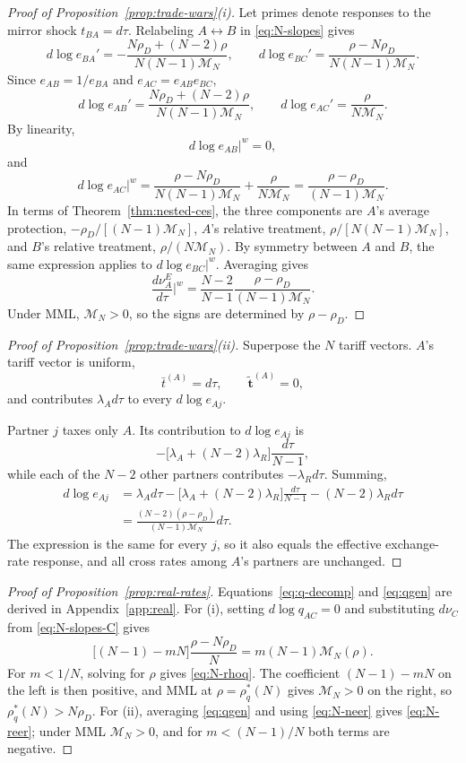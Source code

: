 \documentclass[11pt]{article}
\begin{document}
\begin{proof}[Proof of Proposition~\ref{prop:trade-wars}(i)]
Let primes denote responses to the mirror shock $t_{BA}=d\tau$. Relabeling $A\leftrightarrow B$ in \eqref{eq:N-slopes} gives
\[
d\log e_{BA}' = -\frac{N\rho_D+(N-2)\rho}{N(N-1)\mathcal M_N},
\qquad
d\log e_{BC}' = \frac{\rho-N\rho_D}{N(N-1)\mathcal M_N}.
\]
Since $e_{AB}=1/e_{BA}$ and $e_{AC}=e_{AB}e_{BC}$,
\[
d\log e_{AB}' = \frac{N\rho_D+(N-2)\rho}{N(N-1)\mathcal M_N},
\qquad
d\log e_{AC}' = \frac{\rho}{N\mathcal M_N}.
\]
By linearity,
\[
d\log e_{AB}\big|^w = 0,
\]
and
\[
d\log e_{AC}\big|^w = \frac{\rho-N\rho_D}{N(N-1)\mathcal M_N} + \frac{\rho}{N\mathcal M_N} = \frac{\rho-\rho_D}{(N-1)\mathcal M_N}.
\]
In terms of Theorem~\ref{thm:nested-ces}, the three components are $A$'s average protection, $-\rho_D/[(N-1)\mathcal M_N]$, $A$'s relative treatment, $\rho/[N(N-1)\mathcal M_N]$, and $B$'s relative treatment, $\rho/(N\mathcal M_N)$.
By symmetry between $A$ and $B$, the same expression applies to $d\log e_{BC}|^w$. Averaging gives
\[
\frac{d\nu_A^E}{d\tau}\bigg|^w = \frac{N-2}{N-1} \frac{\rho-\rho_D}{(N-1)\mathcal M_N}.
\]
Under MML, $\mathcal M_N>0$, so the signs are determined by $\rho-\rho_D$.
\end{proof}

\begin{proof}[Proof of Proposition~\ref{prop:trade-wars}(ii)]
Superpose the $N$ tariff vectors. $A$'s tariff vector is uniform,
\[
\bar t^{(A)} = d\tau,
\qquad
\widetilde{\mathbf{t}}^{(A)} = 0,
\]
and contributes $\lambda_Ad\tau$ to every $d\log e_{Aj}$.

Partner $j$ taxes only $A$. Its contribution to $d\log e_{Aj}$ is
\[
-\big[ \lambda_A+(N-2)\lambda_R \big] \frac{d\tau}{N-1},
\]
while each of the $N-2$ other partners contributes $-\lambda_Rd\tau$. Summing,
\[
\begin{aligned}
d\log e_{Aj}
&=
\lambda_Ad\tau
-
\big[
\lambda_A+(N-2)\lambda_R
\big]
\frac{d\tau}{N-1}
-
(N-2)\lambda_Rd\tau\\
&=
\frac{(N-2)(\rho-\rho_D)}{(N-1)\mathcal M_N}d\tau.
\end{aligned}
\]
The expression is the same for every $j$, so it also equals the effective exchange-rate response, and all cross rates among $A$'s partners are unchanged.
\end{proof}

\begin{proof}[Proof of Proposition~\ref{prop:real-rates}]
Equations~\eqref{eq:q-decomp} and \eqref{eq:qgen} are derived in Appendix~\ref{app:real}. For (i), setting $d\log q_{AC}=0$ and substituting $d\nu_C$ from \eqref{eq:N-slopes-C} gives
\[
\big[ (N-1)-mN \big] \frac{\rho-N\rho_D}{N} = m(N-1)\mathcal M_N(\rho).
\]
For $m<1/N$, solving for $\rho$ gives \eqref{eq:N-rhoq}. The coefficient $(N-1)-mN$ on the left is then positive, and MML at $\rho=\rho_q^*(N)$ gives $\mathcal M_N>0$ on the right, so $\rho_q^*(N)>N\rho_D$. For (ii), averaging \eqref{eq:qgen} and using \eqref{eq:N-neer} gives \eqref{eq:N-reer}; under MML $\mathcal M_N>0$, and for $m<(N-1)/N$ both terms are negative.
\end{proof}
\end{document}
